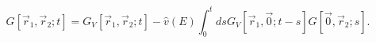 \begin{equation}
\label{integral}
G[\vec{r}_1, \vec{r}_2; t] = G_V[\vec{r}_1, \vec{r}_2; t] - 
\hat{v}(E) \int_0^t ds G_V[\vec{r}_1, \vec{0}; t - s] G[\vec{0}, \vec{r}_2; s].
\end{equation}

